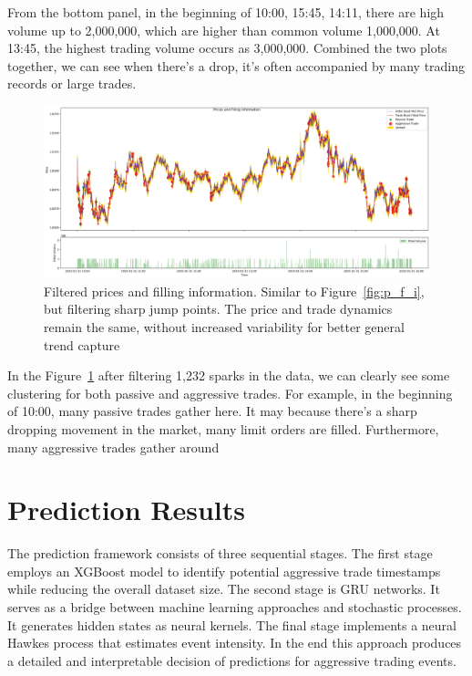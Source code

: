 From the bottom panel, in the beginning of 10:00, 15:45, 14:11, there are high volume up to 2,000,000, which are higher than common volume 1,000,000. At 13:45, the highest trading volume occurs as 3,000,000. Combined the two plots together, we can see when there's a drop, it's often accompanied by many trading records or large trades. 

\begin{figure}[h]
    \centering
    \includegraphics[width=1\linewidth]{figures/Filtered Prices and Filling Information.png}
    \caption{Filtered prices and filling information. Similar to Figure~\ref{fig:p_f_i}, but filtering sharp jump points. The price and trade dynamics remain the same, without increased variability for better general trend capture}
    \label{fig:f_p_f_i}
\end{figure}

In the Figure~\ref{fig:f_p_f_i} after filtering 1,232 sparks in the data, we can clearly see some clustering for both passive and aggressive trades. For example, in the beginning of 10:00, many passive trades gather here. It may because there's a sharp dropping movement in the market, many limit orders are filled. Furthermore, many aggressive trades gather around  



\section{Prediction Results}
The prediction framework consists of three sequential stages. The first stage employs an XGBoost model to identify potential aggressive trade timestamps while reducing the overall dataset size. The second stage is GRU networks. It serves as a bridge between machine learning approaches and stochastic processes. It generates hidden states as neural kernels. The final stage implements a neural Hawkes process that estimates event intensity. In the end this approach produces a detailed and interpretable decision of predictions for aggressive trading events.

